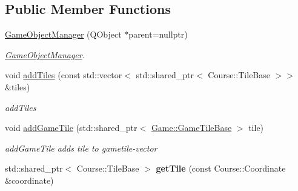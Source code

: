 \subsection*{Public Member Functions}
\begin{DoxyCompactItemize}
\item 
\hyperlink{class_game_1_1_game_object_manager_a6f07c1fc06916333432392170fab4439}{Game\-Object\-Manager} (Q\-Object $\ast$parent=nullptr)
\begin{DoxyCompactList}\small\item\em \hyperlink{class_game_1_1_game_object_manager}{Game\-Object\-Manager}. \end{DoxyCompactList}\item 
void \hyperlink{class_game_1_1_game_object_manager_a616e55e5188f96f3925b7f14f4f9b2f1}{add\-Tiles} (const std\-::vector$<$ std\-::shared\-\_\-ptr$<$ Course\-::\-Tile\-Base $>$$>$ \&tiles)
\begin{DoxyCompactList}\small\item\em add\-Tiles \end{DoxyCompactList}\item 
\hypertarget{class_game_1_1_game_object_manager_abfe2898c4389ca575093917f88e0087b}{void \hyperlink{class_game_1_1_game_object_manager_abfe2898c4389ca575093917f88e0087b}{add\-Game\-Tile} (std\-::shared\-\_\-ptr$<$ \hyperlink{class_game_1_1_game_tile_base}{Game\-::\-Game\-Tile\-Base} $>$ tile)}\label{class_game_1_1_game_object_manager_abfe2898c4389ca575093917f88e0087b}

\begin{DoxyCompactList}\small\item\em add\-Game\-Tile adds tile to gametile-\/vector \end{DoxyCompactList}\item 
\hypertarget{class_game_1_1_game_object_manager_aff2871bd2a6f7daae354da6fee9e1d5d}{std\-::shared\-\_\-ptr$<$ Course\-::\-Tile\-Base $>$ {\bfseries get\-Tile} (const Course\-::\-Coordinate \&coordinate)}\label{class_game_1_1_game_object_manager_aff2871bd2a6f7daae354da6fee9e1d5d}


\end{DoxyCompactItemize}
